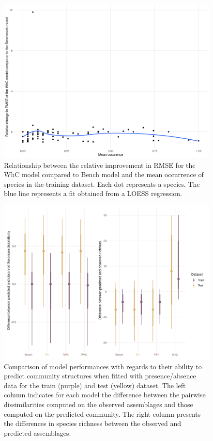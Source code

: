 \begin{figure}
\hypertarget{fig:chapt1supp21}{%
\centering
\includegraphics{03-Chapitre1/figures/supplementary/fig_supp21.png}
\caption{Relationship between the relative improvement in RMSE for the
WhC model compared to Bench model and the mean occurrence of species in
the training dataset. Each dot represents a species. The blue line
represents a fit obtained from a LOESS
regression.}\label{fig:chapt1supp21}
}
\end{figure}

\begin{figure}
\hypertarget{fig:fig22}{%
\centering
\includegraphics{03-Chapitre1/figures/supplementary/fig_supp22.png}
\caption{Comparison of model performances with regards to their ability
to predict community structures when fitted with presence/absence data
for the train (purple) and test (yellow) dataset. The left column
indicates for each model the difference between the pairwise
dissimilarities computed on the observed assemblages and those computed
on the predicted community. The right column presents the differences in
species richness between the observed and predicted
assemblages.}\label{fig:fig22}
}
\end{figure}

